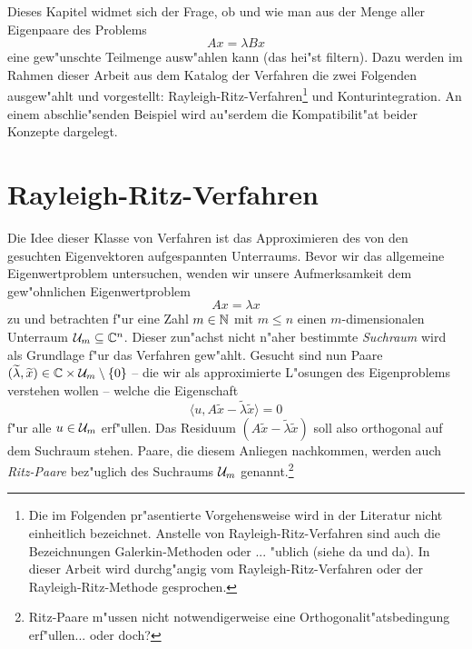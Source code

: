 Dieses Kapitel widmet sich der Frage, ob und wie man aus der Menge aller Eigenpaare
des Problems
\[
Ax = \lambda Bx
\]
eine gew"unschte Teilmenge ausw"ahlen kann (das hei"st filtern). Dazu werden im Rahmen dieser Arbeit aus dem Katalog der Verfahren
die zwei Folgenden ausgew"ahlt und vorgestellt: Rayleigh-Ritz-Verfahren\footnote{Die im Folgenden pr"asentierte Vorgehensweise wird in der
Literatur nicht einheitlich bezeichnet. Anstelle von Rayleigh-Ritz-Verfahren sind auch die Bezeichnungen Galerkin-Methoden oder ... "ublich (siehe da und da).
In dieser Arbeit wird durchg"angig vom Rayleigh-Ritz-Verfahren oder der Rayleigh-Ritz-Methode
gesprochen.} und Konturintegration. An einem abschlie"senden Beispiel wird au"serdem die Kompatibilit"at beider Konzepte dargelegt.

\section{Rayleigh-Ritz-Verfahren}\label{sec:ritz}
Die Idee dieser Klasse von Verfahren ist das Approximieren des von
den gesuchten Eigenvektoren aufgespannten Unterraums. %
Bevor wir das allgemeine Eigenwertproblem untersuchen, wenden wir unsere Aufmerksamkeit
dem gew"ohnlichen Eigenwertproblem
\[
Ax = \lambda x%
\]
zu und betrachten f"ur eine Zahl $m\in\mathbb{N}$ mit $m\le n$
einen $m$-dimensionalen Unterraum $\mathcal{U}_m\subseteq\mathbb{C}^n$. Dieser zun"achst nicht
n"aher bestimmte \emph{Suchraum} wird als Grundlage f"ur das Verfahren gew"ahlt.
Gesucht sind nun Paare $(\widetilde{\lambda}, \widetilde{x})\in\mathbb{C}\times \mathcal{U}_m \setminus\{0\}$ --
die wir als approximierte L"osungen des Eigenproblems verstehen wollen --
welche die Eigenschaft
\begin{equation}\label{eq:orthogonal}
\langle u, A\widetilde{x} - \widetilde{\lambda}\widetilde{x} \rangle=0
\end{equation}
f"ur alle $u \in \mathcal{U}_m $ erf"ullen. Das Residuum $(A\widetilde{x} - \widetilde{\lambda}\widetilde{x})$
soll also orthogonal auf dem Suchraum stehen. Paare, die diesem Anliegen nachkommen,
werden auch \emph{Ritz-Paare} bez"uglich des Suchraums $\mathcal{U}_m$ genannt.\footnote{Ritz-Paare m"ussen nicht notwendigerweise eine Orthogonalit"atsbedingung erf"ullen... oder doch?}\\

